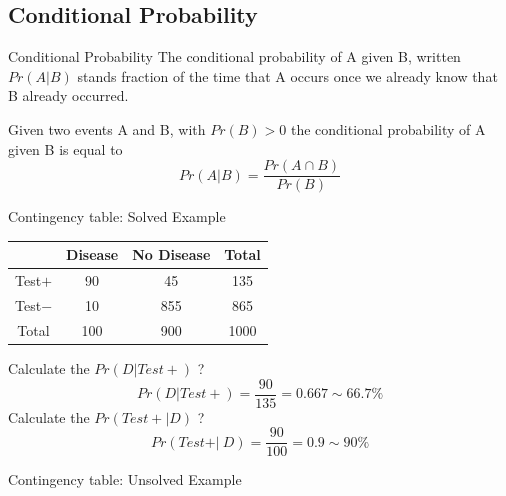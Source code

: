 \documentclass{beamer}
\begin{document}
\subsection{Conditional Probability}
\begin{frame}{Conditional Probability}
    The conditional probability of A given B, written $Pr(A|B)$ stands  fraction of the time that A occurs once we already know that B already occurred. 
    \begin{definition}
        Given two events A and B, with $Pr(B)> 0$ the conditional probability of A given B is equal to
        \begin{equation}
            Pr(A|B)=\frac{Pr(A\cap B)}{Pr(B)}
        \end{equation}
        
        
    \end{definition}
    \begin{example}
        
    \end{example}
\end{frame}
\begin{frame}{Contingency table: Solved Example}
    \begin{table}[]
    \centering
    \begin{tabular}{|c|c|c|c|}
        \hline
        \textbf{} & \textbf{Disease} & \textbf{No Disease} & \textbf{Total}\\
        \hline
        Test$+$ & 90 & 45 & 135\\
        \hline
        Test$-$ & 10 & 855 & 865\\
        \hline
         Total& 100 & 900 & 1000\\
         \hline
    \end{tabular}
    
\end{table}
\vspace{0.3cm}
Calculate the $Pr(D|Test+)$ ?
\begin{equation}
    Pr(D|Test+) = \frac{90}{135} =0.667 \sim 66.7\%
\end{equation}
\vspace{0.3cm}
Calculate the $Pr(Test+|D)$ ?
\begin{equation}
    Pr(Test+\vert ~D) = \frac{90}{100} =0.9 \sim 90\%
\end{equation}
\end{frame}

\begin{frame}{Contingency table: Unsolved Example}

    
\end{frame}
\end{document}
